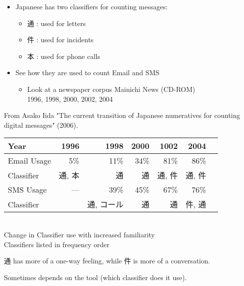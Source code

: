 \documentclass[a4paper,landscape,headrule,footrule,dvips]{foils}
\begin{document}
\begin{CJK}{UTF8}{min}

\begin{itemize}
\item Japanese has two classifiers for counting messages:
  \begin{itemize}
  \item 通 : used for letters
  \item 件 : used for incidents
  \item 本 : used for phone calls
  \end{itemize}
\item See how they are used to count Email and SMS
  \begin{itemize}
  \item Look at a newspaper corpus Mainichi News (CD-ROM)
\\ 1996, 1998, 2000, 2002, 2004 
  \end{itemize}
\end{itemize}

From Asako Iida "The current transition of Japanese numeratives for counting digital messages" (2006).



\begin{center}
  \begin{tabular}{lrrrrrr}
    Year &  1996 & 1998 & 2000 & 1002 & 2004 \\ \hline
    Email Usage & 5\% & 11\% & 34\% & 81\% & 86\%\\
    Classifier  & 通, 本  & 通  & 通 & 通, 件 & 通, 件 \\
    SMS  Usage &   ---  & 39\% & 45\% & 67\% & 76\%\\
    Classifier  &  &  通, コール  & 通  & 通 & 件, 通 \\
  \end{tabular}
  \\[2ex] Change in Classifier use with increased familiarity
  \\ Classifiers listed in frequency order
\end{center}

通 has more of a one-way feeling, while  件 is more of a conversation.

Sometimes depends on the tool (which classifier does it use).



\end{CJK}
\end{document}
